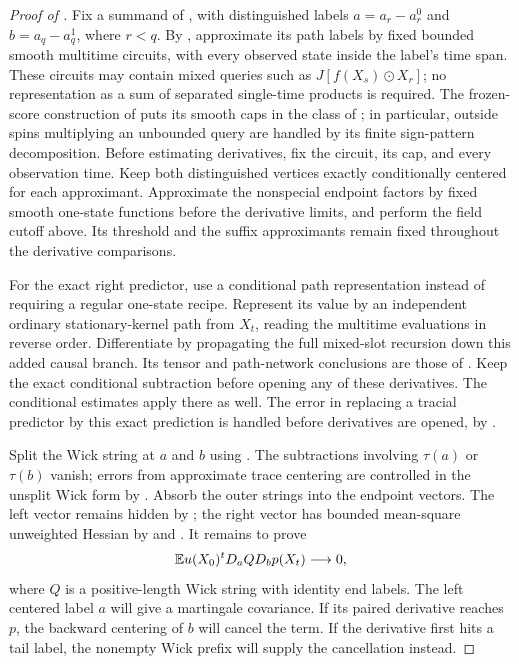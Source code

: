 \begin{proof}[Proof of ]
Fix a summand of , with
distinguished labels
$a=a_r-a_r^0$ and $b=a_q-a_q^1$, where $r<q$. By
, approximate its path labels by fixed
bounded smooth multitime circuits, with every observed state inside
the label's time span. These circuits may contain mixed queries such
as $J[f(X_s)\odot X_r]$; no representation as a sum of separated
single-time products is required. The frozen-score construction of
 puts its smooth caps in the
class of ; in particular, outside spins
multiplying an unbounded query are handled by its finite
sign-pattern decomposition. Before estimating derivatives, fix the circuit, its cap, and every
observation time. Keep both distinguished vertices exactly
conditionally centered for each approximant. Approximate the
nonspecial endpoint factors by fixed smooth one-state functions
before the derivative limits, and perform the field cutoff above.
Its threshold and the suffix approximants remain fixed throughout
the derivative comparisons.

For the exact right predictor, use a conditional path representation
instead of requiring a regular one-state recipe. Represent its value
by an independent ordinary stationary-kernel path from $X_t$, reading
the multitime evaluations in reverse order. Differentiate by propagating
the full mixed-slot recursion down this added causal branch.
Its tensor and path-network conclusions are those of
.
Keep the exact conditional subtraction before opening any of these
derivatives. The conditional estimates
 apply
there as well. The error in replacing a tracial predictor by this
exact prediction is handled before derivatives are opened, by
.

Split the Wick string at $a$ and $b$ using
. The subtractions involving $\tau(a)$ or
$\tau(b)$ vanish; errors from approximate trace centering are
controlled in the unsplit Wick form by
. Absorb the outer strings into the
endpoint vectors. The left vector remains hidden by
; the right vector has bounded mean-square
unweighted Hessian by  and
. It remains to prove
\begin{equation}\label{eq:hidden-covariance-target}
 \mathbb E u(X_0)^tD_a QD_b p(X_t)\longrightarrow0,
\end{equation}
where $Q$ is a positive-length Wick string with identity end labels.
The left centered label $a$ will give a martingale covariance. If its
paired derivative reaches $p$, the backward centering of $b$ will
cancel the term. If the derivative first hits a tail label, the
nonempty Wick prefix will supply the cancellation instead.


\end{proof}
